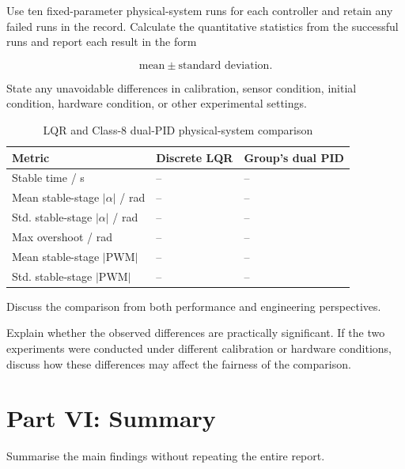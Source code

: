 \documentclass[11pt,a4paper]{article}
\newcommand{\studenttext}[1]{\begin{studentbox}\vspace{#1}\end{studentbox}}
\begin{document}
Use ten fixed-parameter physical-system runs for each controller and retain any
failed runs in the record. Calculate the quantitative statistics from the
successful runs and report each result in the form

\[
\text{mean}\pm\text{standard deviation}.
\]

State any unavoidable differences in calibration, sensor condition, initial
condition, hardware condition, or other experimental settings.

\begin{table}[H]
\centering
\caption{LQR and Class-8 dual-PID physical-system comparison}
\label{tab:lqrpidhw}
\small
\begin{tabularx}{\linewidth}
{>{\raggedright\arraybackslash}X
 >{\centering\arraybackslash}X
 >{\centering\arraybackslash}X}
\toprule
Metric & Discrete LQR & Group's dual PID\\
\midrule
Stable time / s & -- & --\\
Mean stable-stage $|\alpha|$ / rad & -- & --\\
Std. stable-stage $|\alpha|$ / rad & -- & --\\
Max overshoot / rad & -- & --\\
Mean stable-stage $|\mathrm{PWM}|$ & -- & --\\
Std. stable-stage $|\mathrm{PWM}|$ & -- & --\\
\bottomrule
\end{tabularx}
\end{table}



Discuss the comparison from both performance and engineering perspectives.

Explain whether the observed differences are practically significant. If the
two experiments were conducted under different calibration or hardware
conditions, discuss how these differences may affect the fairness of the
comparison.

\studenttext{10mm}


\section{Part VI: Summary}
\label{sec:summary}

Summarise the main findings without repeating the entire report. 
\studenttext{25mm}
\end{document}
